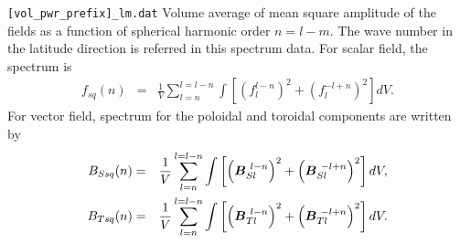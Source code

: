 \begin{description}
\item{\tt [vol\_pwr\_prefix]\_lm.dat} Volume average of mean square amplitude of the fields as a function of spherical harmonic order $n = l-m$. The wave number in the latitude direction is referred in this spectrum data. For scalar field, the spectrum is
\begin{eqnarray}
f_{sq}(n) &=& \frac{1}{V} \sum_{l=n}^{l=l-n} \int \left[ \left(f_{l}^{l-n}\right)^{2} + \left(f_{l}^{-l+n}\right)^2 \right] dV.
\nonumber
\end{eqnarray}
For vector field, spectrum for the poloidal and toroidal components are written by 
\begin{eqnarray}
B_{Ssq}(n) &=& \frac{1}{V} \sum_{l=n}^{l=l-n} \int  \left[\left(\mbox{\boldmath$B$}_{Sl}^{\ l-n} \right)^{2} 
 + \left(\mbox{\boldmath$B$}_{Sl}^{\ -l+n} \right)^{2}  \right]  dV,
\nonumber \\
B_{Tsq}(n) &=& \frac{1}{V} \sum_{l=n}^{l=l-n} \int \left[\left(\mbox{\boldmath$B$}_{Tl}^{\ l-n} \right)^{2} 
 + \left(\mbox{\boldmath$B$}_{Tl}^{\ -l+n} \right)^{2}  \right] dV.
\nonumber
\end{eqnarray}

\end{description}

%

